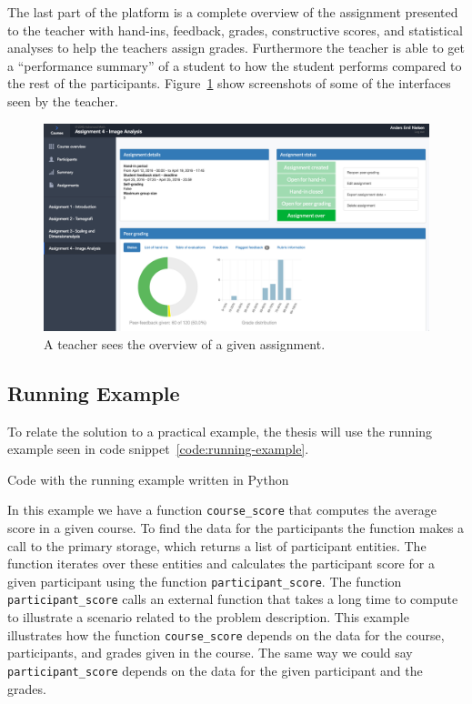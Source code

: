 The last part of the platform is a complete overview of the assignment presented to the teacher with hand-ins, feedback, grades, constructive scores, and statistical analyses to help the teachers assign grades. Furthermore the teacher is able to get a ``performance summary'' of a student to how the student performs compared to the rest of the participants. Figure~\ref{fig:teacher-screenshot} show screenshots of some of the interfaces seen by the teacher.

\begin{figure}[ht!]
  \centering
  \includegraphics[width=1.0\linewidth]{figures/screenshots/teacher_assignment_overview.png}
  \caption[Screenshot from Peergrade.io]{A teacher sees the overview of a given assignment.}
  \label{fig:teacher-screenshot}
\end{figure}


\subsection{Running Example}
\label{subsec:running-example}

To relate the solution to a practical example, the thesis will use the running example seen in code snippet~\ref{code:running-example}.

\begin{code}{Code with the running example written in Python}
	
	\label{code:running-example}
\end{code}

In this example we have a function \verb$course_score$ that computes the average score in a given course. To find the data for the participants the function makes a call to the primary storage, which returns a list of participant entities. The function iterates over these entities and calculates the participant score for a given participant using the function \verb$participant_score$. The function \verb$participant_score$ calls an external function that takes a long time to compute to illustrate a scenario related to the problem description. This example illustrates how the function \verb$course_score$ depends on the data for the course, participants, and grades given in the course. The same way we could say \verb$participant_score$ depends on the data for the given participant and the grades.

